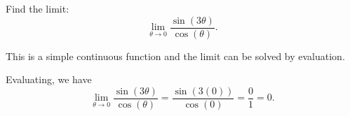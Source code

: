 \documentclass{ximera}
\author{Emma Smith Zbarsky}
\begin{document}
\begin{exercise}

Find the limit:
\[\lim_{\theta \to 0} \frac{\sin(3\theta)}{\cos(\theta)}.\]


\begin{hint}
This is a simple continuous function and the limit can be solved by
evaluation.
\end{hint}


\begin{hint}
Evaluating, we have
\[\lim_{\theta \to 0} \frac{\sin(3\theta)}{\cos(\theta)} = \frac{\sin(3(0))}{\cos(0)} = \frac{0}{1} = 0.\]
\end{hint}


\begin{multipleChoice}
\choice{$\infty$}
\choice{$-\infty$}
\end{multipleChoice}

\end{exercise}
\end{document}
